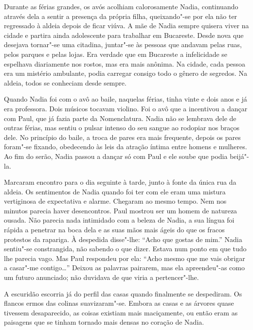 Durante as férias grandes, os avós acolhiam calorosamente Nadia,
continuando através dela a sentir a presença da própria filha,
queixando"-se por ela não ter regressado à aldeia depois de ficar viúva.
A mãe de Nadia sempre quisera viver na cidade e partira ainda
adolescente para trabalhar em Bucareste. Desde nova que desejava
tornar"-se uma citadina, juntar"-se às pessoas que andavam pelas ruas,
pelos parques e pelas lojas. Era verdade que em Bucareste a infelicidade
se espelhava diariamente nos rostos, mas era mais anônima. Na cidade,
cada pessoa era um mistério ambulante, podia carregar consigo todo o
gênero de segredos. Na aldeia, todos se conheciam desde sempre.

Quando Nadia foi com o avô ao baile, naquelas férias, tinha vinte e dois
anos e já era professora. Dois músicos tocavam violino. Foi o avô que a
incentivou a dançar com Paul, que já fazia parte da Nomenclatura. Nadia
não se
lembrava dele de outras férias, mas sentiu o pulsar intenso do seu
sangue ao rodopiar nos braços dele. No princípio do baile, a troca de
pares era mais frequente, depois os pares foram"-se fixando, obedecendo
às leis da atração íntima entre homens e mulheres. Ao fim do serão,
Nadia passou a dançar só com Paul e ele soube que podia beijá"-la.

Marcaram encontro para o dia seguinte à tarde, junto à fonte da única
rua da aldeia. Os sentimentos de Nadia quando foi ter com ele eram uma
mistura vertiginosa de expectativa e alarme. Chegaram ao mesmo tempo.
Nem nos minutos parecia haver desencontros. Paul mostrou ser um homem de
natureza ousada. Não parecia nada intimidado com a beleza de Nadia, a
sua língua foi rápida a penetrar na boca dela e as suas mãos mais ágeis
do que os fracos protestos da rapariga. À despedida disse"-lhe: ``Acho que
gostas de mim.'' Nadia sentiu"-se constrangida, não sabendo o que dizer.
Estava num ponto em que tudo lhe parecia vago. Mas Paul respondeu por
ela: ``Acho mesmo que me vais obrigar a casar"-me contigo\ldots{}'' Deixou
as palavras pairarem, mas ela apreendeu"-as como um futuro anunciado; não
duvidava de que viria a pertencer"-lhe.

A escuridão escorria já do perfil das casas quando finalmente se despediram. Os flancos ermos das colinas suavizaram"-se. Embora
as casas e as árvores quase tivessem desaparecido, as coisas existiam
mais maciçamente, ou então eram as paisagens que se tinham tornado mais
densas no coração de Nadia.

